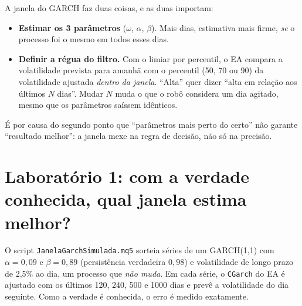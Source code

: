\documentclass[11pt,a4paper]{article}
\begin{document}
A janela do GARCH faz duas coisas, e as duas importam:

\begin{itemize}\setlength\itemsep{2pt}
\item \textbf{Estimar os 3 parâmetros} ($\omega$, $\alpha$, $\beta$). Mais dias, estimativa mais firme, \emph{se}
o processo foi o mesmo em todos esses dias.
\item \textbf{Definir a régua do filtro.} Com o limiar por percentil, o EA compara a volatilidade prevista para
amanhã com o percentil (50, 70 ou 90) da volatilidade ajustada \emph{dentro da janela}. ``Alta'' quer dizer
``alta em relação aos últimos $N$ dias''. Mudar $N$ muda o que o robô considera um dia agitado, mesmo que os
parâmetros saíssem idênticos.
\end{itemize}

É por causa do segundo ponto que ``parâmetros mais perto do certo'' não garante ``resultado melhor'': a janela
mexe na regra de decisão, não só na precisão.

\section{Laboratório 1: com a verdade conhecida, qual janela estima melhor?}\label{sec:lab}

O script \texttt{JanelaGarchSimulada.mq5} sorteia  séries de um GARCH(1,1) com
$\alpha=0{,}09$ e $\beta=0{,}89$ (persistência verdadeira $0{,}98$) e volatilidade de longo prazo de 2,5\% ao dia,
um processo que \emph{não muda}. Em cada série, o \texttt{CGarch} do EA é ajustado com os últimos 120, 240, 500 e
1000 dias e prevê a volatilidade do dia seguinte. Como a verdade é conhecida, o erro é medido exatamente.
\end{document}
